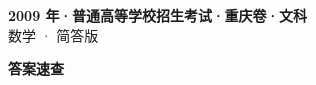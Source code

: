 \documentclass[zihao=-4, a4paper]{ctexart}
\begin{document}
\begin{center}
  {\Large\bfseries 2009 年·普通高等学校招生考试·重庆卷·文科}\\[4pt]
  {\large 数学 · 简答版}
\end{center}
\medskip
{}

\clearpage
{}
\begin{center}{\Large\bfseries 答案速查}\end{center}
\medskip

\end{document}
